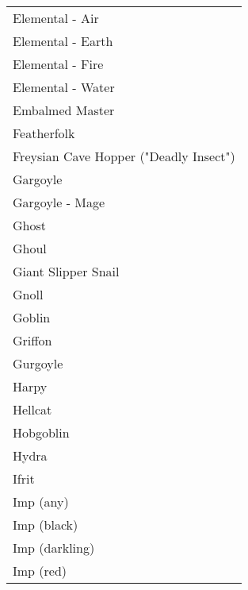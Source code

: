 \documentclass[twoside]{book}
\begin{document}
\begin{longtable}{p{1.25in}}
  \raggedright
           Elemental - Air 
  \tabularnewline
      
  \raggedright
           Elemental - Earth 
  \tabularnewline
      
  \raggedright
           Elemental - Fire 
  \tabularnewline
      
  \raggedright
           Elemental - Water 
  \tabularnewline
      
  \raggedright
           Embalmed Master 
  \tabularnewline
      
  \raggedright
           Featherfolk 
  \tabularnewline
      
  \raggedright
           Freysian Cave Hopper ("Deadly
           Insect") 
  \tabularnewline
      
  \raggedright
           Gargoyle 
  \tabularnewline
      
  \raggedright
           Gargoyle - Mage 
  \tabularnewline
      
  \raggedright
           Ghost 
  \tabularnewline
      
  \raggedright
           Ghoul 
  \tabularnewline
      
  \raggedright
           Giant Slipper Snail 
  \tabularnewline
      
  \raggedright
           Gnoll 
  \tabularnewline
      
  \raggedright
           Goblin 
  \tabularnewline
      
  \raggedright
           Griffon 
  \tabularnewline
      
  \raggedright
           Gurgoyle 
  \tabularnewline
      
  \raggedright
           Harpy 
  \tabularnewline
      
  \raggedright
           Hellcat 
  \tabularnewline
      
  \raggedright
           Hobgoblin 
  \tabularnewline
      
  \raggedright
           Hydra 
  \tabularnewline
      
  \raggedright
           Ifrit 
  \tabularnewline
      
  \raggedright
           Imp (any) 
  \tabularnewline
      
  \raggedright
           Imp (black) 
  \tabularnewline
      
  \raggedright
           Imp (darkling) 
  \tabularnewline
      
  \raggedright
           Imp (red) 
  \tabularnewline
      

\end{longtable}
\end{document}
